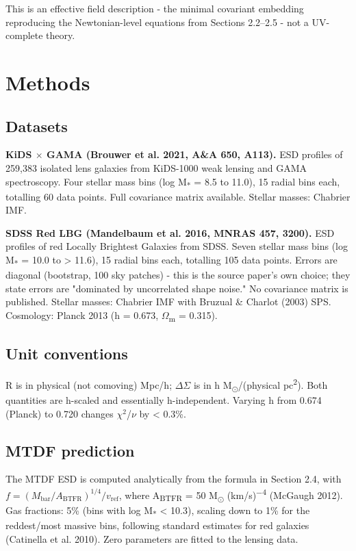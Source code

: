 \documentclass[11pt,a4paper]{article}
\begin{document}
This is an effective field description  -  the minimal covariant embedding reproducing the Newtonian-level equations from Sections 2.2--2.5  -  not a UV-complete theory.

\section{Methods}
\label{sec:methods}

\subsection{Datasets}
\textbf{KiDS $\times$ GAMA (Brouwer et al. 2021, A\&A 650, A113).} ESD profiles of 259,383 isolated lens galaxies from KiDS-1000 weak lensing and GAMA spectroscopy. Four stellar mass bins (log M\textsubscript{*} = 8.5 to 11.0), 15 radial bins each, totalling 60 data points. Full covariance matrix available. Stellar masses: Chabrier IMF.

\textbf{SDSS Red LBG (Mandelbaum et al. 2016, MNRAS 457, 3200).} ESD profiles of red Locally Brightest Galaxies from SDSS. Seven stellar mass bins (log M\textsubscript{*} = 10.0 to > 11.6), 15 radial bins each, totalling 105 data points. Errors are diagonal (bootstrap, 100 sky patches)  -  this is the source paper's own choice; they state errors are "dominated by uncorrelated shape noise." No covariance matrix is published. Stellar masses: Chabrier IMF with Bruzual \& Charlot (2003) SPS. Cosmology: Planck 2013 (h = 0.673, $\Omega$\textsubscript{m} = 0.315).

\subsection{Unit conventions}
R is in physical (not comoving) Mpc/\allowbreak{}h; $\Delta$$\Sigma$ is in h M\textsubscript{$\odot$}/(physical pc\textsuperscript{2}). Both quantities are h-scaled and essentially h-independent. Varying h from 0.674 (Planck) to 0.720 changes $\chi$$^{2}$/$\nu$ by < 0.3\%.

\subsection{MTDF prediction}
The MTDF ESD is computed analytically from the formula in Section 2.4, with \(f = (M_{\mathrm{bar}} / A_{\mathrm{BTFR}})^{1/4} / v_{\mathrm{ref}}\), where A\textsubscript{BTFR} = 50 M\textsubscript{$\odot$} (km/\allowbreak{}s)\textsuperscript{$-$4} (McGaugh 2012). Gas fractions: 5\% (bins with log M\textsubscript{*} < 10.3), scaling down to 1\% for the reddest/\allowbreak{}most massive bins, following standard estimates for red galaxies (Catinella et al. 2010). Zero parameters are fitted to the lensing data.
\end{document}
